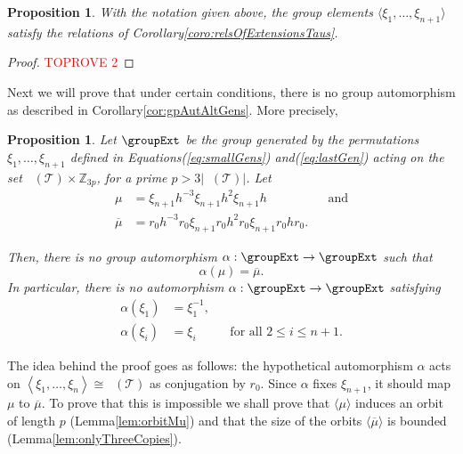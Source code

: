 \documentclass[final]{amsart}
\theoremstyle{plain}
\newtheorem{prop}[thm]{Proposition}
\theoremstyle{definition}
\theoremstyle{remark}
\numberwithin{equation}{section}
\renewcommand{\leq}{\leqslant} \renewcommand{\geq}{\geqslant}
\renewcommand{\{}{\lbrace}
\renewcommand{\}}{\rbrace}
\renewcommand{\bar}{\overline}
\newcommand{\bZ}{\mathbb{Z}}
\newcommand{\cT}{\mathcal{T}}
\DeclareMathOperator{\Fw}{\mathcal{F}^{w}}
\DeclareMathOperator{\mon}{Mon}
\DeclareMathOperator{\monw}{\mon^{w}}
\newcommand{\kng}{{h}}
\newcommand{\mub}{\bar{\mu}}
\newcommand{\te}{\xi}
\begin{document}
\begin{prop} \label{prop:chiralExtRelations}
 With the notation given above, the group elements $\langle \te_{1}, \dots, \te_{n+1} \rangle$ satisfy the relations of Corollary\nobreakspace \ref {coro:relsOfExtensionsTaus}.
\end{prop}
\begin{proof}\textcolor{red}{TOPROVE 2}\end{proof}


Next we will prove that under certain conditions, there is no group automorphism as described in Corollary\nobreakspace \ref {cor:gpAutAltGens}. 
More precisely,

\begin{prop}\label{prop:noGroupAut}
  Let $\groupExt$ be the group generated by the permutations $ \te_{1}, \dots, \te_{n+1} $ defined in Equations\nobreakspace \textup {(\ref {eq:smallGens})} and\nobreakspace  \textup {(\ref {eq:lastGen})} acting on  the set $\Fw(\cT) \times \bZ_{3p}$, for a prime $p > 3|\Fw(\cT)|$.
  Let
  \begin{equation}
    \label{eq:mu}
    \begin{aligned}
      \mu &= \te_{n+1}\kng^{-3}\te_{n+1} \kng^{2} \te_{n+1} \kng &&\text{and} \\
      \mub&= r_{0}\kng^{-3} r_{0}\te_{n+1} r_{0}\kng^{2} r_{0} \te_{n+1} r_{0}\kng r_{0}.
    \end{aligned}
  \end{equation}

  Then, there is no group automorphism $\alpha: \groupExt \to \groupExt$ such that \[\alpha(\mu) = \mub.\]
  In particular, there is no automorphism $\alpha:\groupExt \to \groupExt $ satisfying
  \[\begin{aligned}
	    \alpha(\te_{1}) &= \te^{-1}_{1},&& \\
    \alpha(\te_{i}) &= \te_{i} &&\text{for all } 2 \leq i \leq n+1.
\end{aligned}\]
\end{prop}




The idea behind the proof goes as follows: the hypothetical automorphism $\alpha$ acts on $\left\langle    \te_{1}, \dots, \te_{n} \right\rangle \cong \monw(\cT) $ as conjugation by $r_{0}$.
Since $\alpha$ fixes $\te_{n+1}$, it should map $\mu$ to $\mub$.
To prove that this is impossible we shall prove that $\langle \mu \rangle$ induces an orbit of length $p$ (Lemma\nobreakspace \ref {lem:orbitMu}) and that the size of the orbits $\langle \mub \rangle$ is bounded (Lemma\nobreakspace \ref {lem:onlyThreeCopies}).
\end{document}
